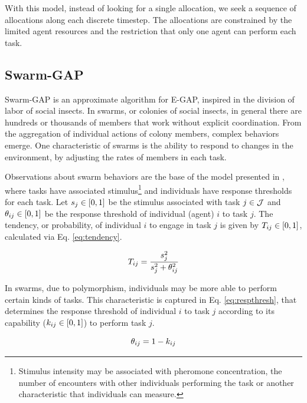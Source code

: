 \documentclass[a4paper]{sbgames}
\begin{document}
With this model, instead of looking for a single allocation, we seek a sequence of allocations along each discrete timestep. The allocations are constrained by the limited agent resources and the restriction that only one agent can perform each task.

\subsection{Swarm-GAP}
\label{sec:swarmgap}

Swarm-GAP is an approximate algorithm for E-GAP, inspired in the division of labor of social insects. In swarms, or colonies of social insects, in general there are hundreds or thousands of members that work without explicit coordination. From the aggregation of individual actions of colony members, complex behaviors emerge. One characteristic of swarms is the ability to respond to changes in the environment, by adjusting the rates of members in each task.

Observations about swarm behaviors are the base of the model presented in \cite{Theraulaz+1998}, where tasks have associated stimulus\footnote{Stimulus intensity may be associated with pheromone concentration, the number of encounters with other individuals performing the task or another characteristic that individuals can measure.} and individuals have response thresholds for each task. Let $s_j \in [0,1]$ be the stimulus associated with task $j \in \mathcal{J}$ and $\theta_{ij} \in [0,1]$ be the response threshold of individual (agent) $i$ to task $j$. The tendency, or probability, of individual $i$ to engage in task $j$ is given by $T_{ij} \in [0,1]$, calculated via Eq. \ref{eq:tendency}.

\begin{equation}
\label{eq:tendency}
T_{ij} = \frac{s_j^2}{s_j^2 + \theta_{ij}^2}
\end{equation}

In swarms, due to polymorphism, individuals may be more able to perform certain kinds of tasks. This characteristic is captured in Eq. \ref{eq:respthresh}, that determines the response threshold of individual $i$ to task $j$ according to its capability ($k_{ij} \in [0,1]$) to perform task $j$.

\begin{equation}
\label{eq:respthresh}
\theta_{ij} = 1 - k_{ij}
\end{equation}
\end{document}
